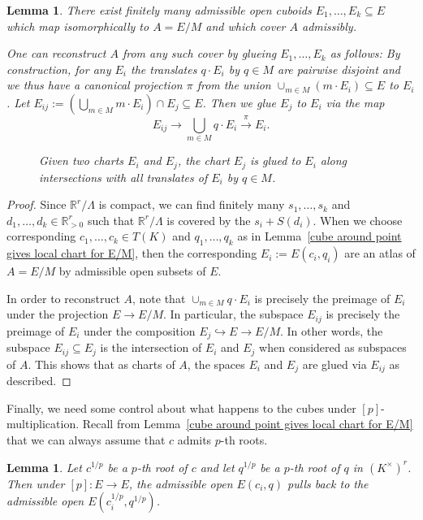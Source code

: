 \documentclass[11pt,oneside]{amsart}
\newtheorem{lemma}[theorem]{Lemma}
\theoremstyle{definition}
\theoremstyle{remark}
\begin{document}
	\begin{lemma}\label{an admissible cover of A by cuboids of E}
	There exist finitely many admissible open cuboids $E_1,\dots,E_k\subseteq E$ which map isomorphically to $A=E/M$ and which cover $A$ admissibly. 
	
	One can reconstruct $A$ from any such cover by glueing $E_1,\dots,E_k$ as follows: By construction, for any $E_i$ the translates $q\cdot E_i$ by $q\in M$ are pairwise disjoint and we thus have a canonical projection $\pi$ from the union $\cup_{m\in M} (m\cdot E_i)\subseteq E$ to $E_i$.	Let $E_{ij}:=(\bigcup_{m\in M} m\cdot E_i)\cap E_j \subseteq E$. Then we glue $E_j$ to $E_i$ via the map
	\[E_{ij}\rightarrow \bigcup_{m\in M} q\cdot E_i \xrightarrow{\pi} E_i.\]
	
	\begin{figure}
		\caption{Given two charts $E_i$ and $E_j$, the chart $E_j$ is glued to $E_i$ along intersections with all translates of $E_i$ by $q\in M$.}
		\label{glue-cover-tikzpicture}
	\end{figure}
	
	\end{lemma} 
	\begin{proof}
	Since $\mathbb R^r/\Lambda$ is compact, we can find finitely many $s_1,\dots,s_k$ and $d_1,\dots,d_k \in \mathbb{R}^r_{>0}$ such that $\mathbb R^r/\Lambda$ is covered by the $s_i+S(d_i)$. When we choose corresponding $c_1,\dots,c_k \in T(K)$ and $q_1,\dots,q_k$ as in Lemma~\ref{cube around point gives local chart for E/M}, then the corresponding $E_i:=E(c_i,q_i)$ are an atlas of $A=E/M$ by admissible open subsets of $E$.
	
	In order to reconstruct $A$, note that $\cup_{m\in M} q\cdot E_i$ is precisely the preimage of $E_i$ under the projection $E\rightarrow E/M$. In particular, the subspace $E_{ij}$ is precisely the preimage of $E_i$ under the composition $E_j\hookrightarrow E \rightarrow E/M$. In other words, the subspace $E_{ij}\subseteq E_j$ is the intersection of $E_i$ and $E_j$ when considered as subspaces of $A$. This shows that as charts of $A$, the spaces $E_i$ and $E_j$ are glued via $E_{ij}$ as described.
	\end{proof}
	Finally, we need some control about what happens to the cubes under $[p]$-multiplication. Recall from Lemma~\ref{cube around point gives local chart for E/M} that we can always assume that $c$ admits $p$-th roots.
	\begin{lemma}\label{pullback of cuboid is cuboid}
		Let $c^{1/p}$ be a $p$-th root of $c$ and let $q^{1/p}$ be a $p$-th root of $q$ in $(K^\times)^r$. Then under $[p]:E\rightarrow E$, the admissible open $E(c_i,q)$ pulls back to the admissible open $E(c_i^{1/p},q^{1/p})$.
	\end{lemma}
\end{document}
